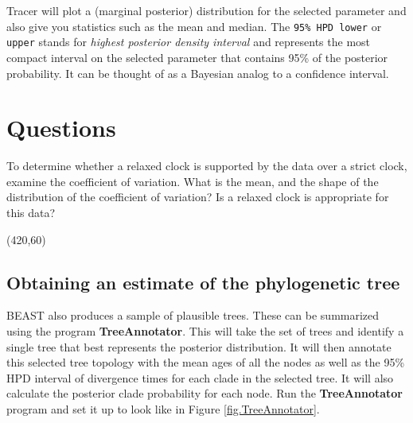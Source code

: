 \documentclass{article}
\begin{document}
Tracer will plot a (marginal posterior) distribution for the selected parameter and also give you statistics such as the mean and median. The \texttt{95\% HPD lower} or \texttt {upper} stands for {\it highest posterior density interval} and represents the most compact interval on the selected parameter that contains 95\% of the posterior probability. It can be thought of as a Bayesian analog to a confidence interval. 


\section*{Questions}

To determine whether a relaxed clock is supported by the data over a strict clock,
examine the coefficient of variation. What is the mean, and the shape of the distribution
of the coefficient of variation? Is a relaxed clock is appropriate for this data?

\vspace{5 mm}
\framebox(420,60){}
\vspace{5 mm}



\subsection*{Obtaining an estimate of the phylogenetic tree}

BEAST also produces a sample of plausible trees. 
These can be summarized using the program {\bf TreeAnnotator}. This will take the set of trees and identify a single tree that best represents the posterior distribution. It will then annotate this selected tree topology with the mean ages of all the
nodes as well as the 95\% HPD interval of divergence times for each clade in the selected tree. It will also calculate the posterior clade probability for each
node. Run the {\bf TreeAnnotator} program and set it up to look like in Figure \ref{fig.TreeAnnotator}.
\end{document}
